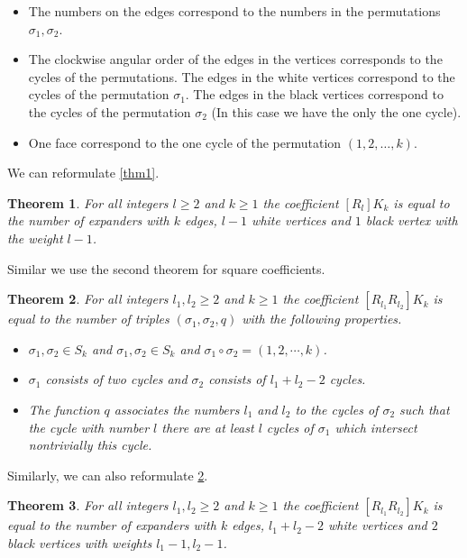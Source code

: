 \documentclass[submission]{FPSAC2021}
\newtheorem{theorem}{Theorem}
\begin{document}
\begin{itemize}

\item The numbers on the edges correspond to the 
numbers in the permutations $\sigma_1, \sigma_2$.

\item The clockwise angular order of the edges in the
vertices corresponds to the cycles of the permutations.
The edges in the white vertices correspond to the cycles
of the permutation $\sigma_1$. The edges in the black
vertices correspond to the cycles of the permutation 
$\sigma_2$ (In this case we have the only the one cycle). 

\item One face correspond to the one cycle of the permutation $(1, 2, \ldots, k)$.

\end{itemize}
We can reformulate \cref{thm1}.
\begin{theorem}
\label{thm2}
For all integers $l\geq2$ and $k\geq 1$ the 
coefficient $[R_l] K_k$ is equal to the number 
of expanders with $k$ edges, $l-1$ white vertices 
and $1$ black vertex with the weight $l-1$.
\end{theorem}
Similar we use the second theorem for square coefficients.
\begin{theorem}
\label{thm3}
For all integers $l_1, l_2\geq 2$ and $k\geq 1$ 
the coefficient $[R_{l_1} R_{l_2}] K_k$ is equal 
to the number of triples $(\sigma_1, \sigma_2, q)$ 
with the following properties.
\begin{itemize}

\item $\sigma_1, \sigma_2 \in S_k$ and 
$\sigma_1, \sigma_2 \in S_k$ 
and $\sigma_1\circ\sigma_2=(1,2,\cdots, k)$.

\item $\sigma_1$ consists of two cycles and 
$\sigma_2$ consists of $l_1+l_2-2$ cycles.

\item The function $q$ associates the numbers 
$l_1$ and $l_2$ to the cycles of $\sigma_2$ 
such that the cycle with number $l$ there are 
at least $l$ cycles of $\sigma_1$ which 
intersect nontrivially this cycle.
\end{itemize}
\end{theorem}
Similarly, we can also reformulate  \cref{thm3}.
\begin{theorem}
\label{thm4}
For all integers $l_1, l_2\geq 2$ and $k\geq 1$ 
the coefficient $[R_{l_1} R_{l_2}] K_k$ is equal 
to the number of expanders with $k$ edges, 
$l_1+l_2-2$ white vertices and $2$ black 
vertices with weights $l_1-1, l_2-1$.
\end{theorem}
\end{document}
